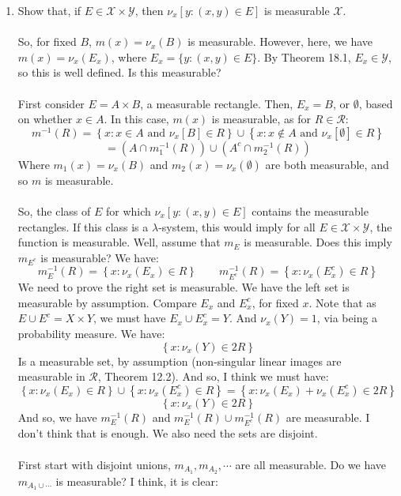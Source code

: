 \documentclass[12pt,a4paper]{article}
\newcommand{\1}[1]{\mathbbm{1}\left\{ #1 \right\}}
\newcommand{\rcal}{\mathcal{R}}
\newcommand{\xcal}{\mathcal{X}}
\newcommand{\ycal}{\mathcal{Y}}
\begin{document}
\begin{enumerate}
	\item Show that, if $E \in \xcal \times \ycal$, then $\nu_x[y : (x, y) \in E]$ is measurable $\xcal$.
	\\\\
	So, for fixed $B$, $m(x) = \nu_x(B)$ is measurable. However, here, we have $m(x) = \nu_x(E_x)$, where $E_x = \{y : (x, y) \in E\}$. By Theorem 18.1, $E_x \in \ycal$, so this is well defined. Is this measurable?
	\\\\
	First consider $E = A \times B$, a measurable rectangle. Then, $E_x = B$, or $\emptyset$, based on whether $x \in A$. In this case, $m(x)$ is measurable, as for $R \in \rcal$:
	$$
		m^{-1}(R) = \left\{x : x \in A \text{ and } \nu_x[B] \in R\right\}
		\cup
		\left\{x : x \not\in A \text{ and } \nu_x[\emptyset] \in R\right\}
	$$
	$$
		= (A \cap m_1^{-1}(R)) \cup (A^c \cap m_2^{-1}(R)) 
	$$
	Where $m_1(x) = \nu_x(B)$ and $m_2(x) = \nu_x(\emptyset)$ are both measurable, and so $m$ is measurable.
	\\\\
	So, the class of $E$ for which $\nu_x[y : (x, y) \in E]$ contains the measurable rectangles. If this class is a $\lambda$-system, this would imply for all $E \in \xcal \times \ycal$, the function is measurable. Well, assume that $m_E$ is measurable. Does this imply $m_{E^c}$ is measurable? We have:
	$$
		m_E^{-1}(R) =
		\left\{x : \nu_x(E_x) \in R\right\}
		\quad\quad
		m_{E^c}^{-1}(R) =
		\left\{x : \nu_x(E^c_x) \in R\right\}
	$$
	We need to prove the right set is measurable. We have the left set is measurable by assumption. Compare $E_x$ and $E^c_x$, for fixed $x$. Note that as $E \cup E^c = X \times Y$, we must have $E_x \cup E^c_x = Y$. And $\nu_x(Y) = 1$, via being a probability measure. We have:
	$$
		\left\{x : \nu_x(Y) \in 2R\right\}
	$$
	Is a measurable set, by assumption (non-singular linear images are measurable in $\rcal$, Theorem 12.2). And so, I think we must have:
	$$
		\left\{x : \nu_x(E_x) \in R\right\} \cup \left\{x : \nu_x(E^c_x) \in R\right\} =
		\left\{x : \nu_x(E_x) + \nu_x(E^c_x) \in 2R\right\} 
	$$
	$$
		\left\{x : \nu_x(Y) \in 2R\right\}
	$$
	And so, we have $m_E^{-1}(R)$ and $m_E^{-1}(R) \cup m_{E^c}^{-1}(R)$ are measurable. I don't think that is enough. We also need the sets are disjoint.
	\\\\
	First start with disjoint unions, $m_{A_1}, m_{A_2}, \cdots$ are all measurable. Do we have $m_{A_1 \cup \cdots}$ is measurable? I think, it is clear:

\end{enumerate}
\end{document}
